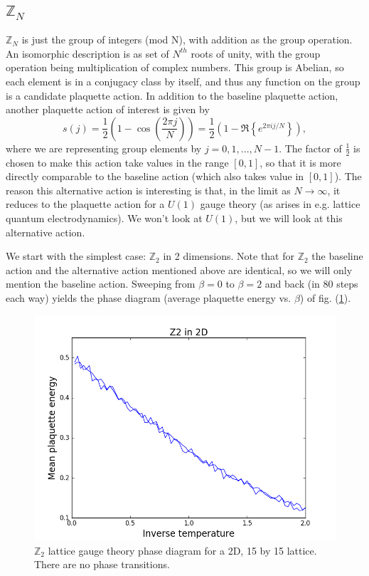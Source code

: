 \documentclass[9pt,twocolumn,twoside]{article}
\begin{document}
\subsection{$\mathbb{Z}_N$}
$\mathbb{Z}_N$ is just the group of integers (mod N), with addition as the group operation.  An isomorphic description is as set of $N^{th}$ roots of unity, with the group operation being multiplication of complex numbers.  This group is Abelian, so each element is in a conjugacy class by itself, and thus any function on the group is a candidate plaquette action.  In addition to the baseline plaquette action, another plaquette action of interest is given by 
\[s(j) = \frac{1}{2}\left(1-\cos\left(\frac{2\pi j}{N}\right)\right) = \frac{1}{2}\left(1 - \Re{\left\{ e^{2\pi i j/N} \right\}}\right),\]
where we are representing group elements by $j=0,1,...,N-1$.  The factor of $\frac{1}{2}$ is chosen to make this action take values in the range $[0,1]$, so that it is more directly comparable to the baseline action (which also takes value in $[0,1]$).  The reason this alternative action is interesting is that, in the limit as $N\rightarrow \infty$, it reduces to the plaquette action for a $U(1)$ gauge theory (as arises in e.g. lattice quantum electrodynamics).  We won't look at $U(1)$, but we will look at this alternative action.  

We start with the simplest case: $\mathbb{Z}_2$ in 2 dimensions.  Note that for $\mathbb{Z}_2$ the baseline action and the alternative action mentioned above are identical, so we will only mention the baseline action.  Sweeping from $\beta=0$ to $\beta=2$ and back (in 80 steps each way) yields the phase diagram (average plaquette energy vs. $\beta$) of fig. (\ref{z2,2d}).
\begin{figure}[h!]
	\begin{centering}
	\includegraphics[width=\columnwidth]{z2,2d}
	\caption[$\mathbb{Z}_2$ lattice gauge theory phase diagram for a 2D lattice.]{$\mathbb{Z}_2$ lattice gauge theory phase diagram for a 2D, 15 by 15 lattice.  There are no phase transitions.}
	\label{z2,2d}
	\end{centering}
\end{figure}
\end{document}
